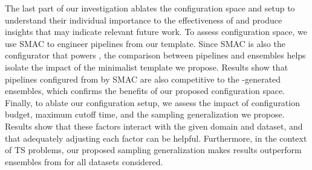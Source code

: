 The last part of our investigation ablates the configuration space and setup to understand their individual importance to the effectiveness of \isklearn and produce insights that may indicate relevant future work. 
To assess configuration space, we use SMAC to engineer pipelines from our template. Since SMAC is also the configurator that powers \autosklearn, the comparison between pipelines and ensembles helps isolate the impact of the minimalist template we propose. Results show that pipelines configured from \isklearn by SMAC are also competitive to the \autosklearn-generated ensembles, which confirms the benefits of our proposed configuration space.
Finally, to ablate our configuration setup, we assess the impact of configuration budget, maximum cutoff time, and the sampling generalization we propose. Results show that these factors interact with the given domain and dataset, and that adequately adjusting each factor can be helpful. 
Furthermore, in the context of TS problems, our proposed sampling generalization makes \isklearn results outperform ensembles from \autosklearn for all datasets considered.


